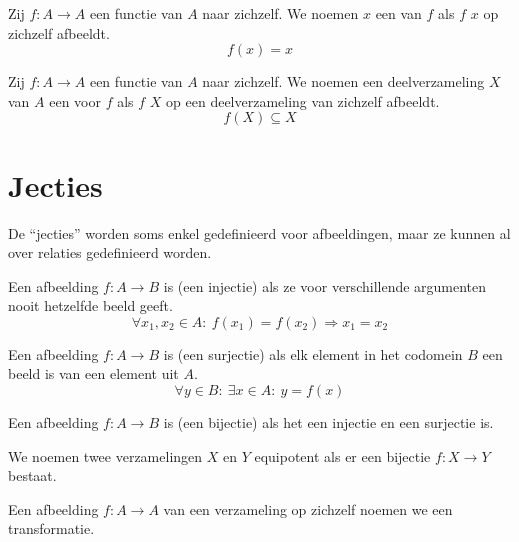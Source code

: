 \documentclass[main.tex]{subfiles}
\begin{document}
\begin{de}
  Zij $f: A \rightarrow A$ een functie van $A$ naar zichzelf.
  We noemen $x$ een  van $f$ als $f$ $x$ op zichzelf afbeeldt.
  \[ f(x) = x \]
\end{de}

\begin{de}
  Zij $f: A \rightarrow A$ een functie van $A$ naar zichzelf.
  We noemen een deelverzameling $X$ van $A$ een  voor $f$ als $f$ $X$ op een deelverzameling van zichzelf afbeeldt.
  \[ f(X) \subseteq X \]
\end{de}

\section{Jecties}
\label{sec:jecties}

\begin{opm}
  De ``jecties'' worden soms enkel gedefinieerd voor afbeeldingen, maar ze kunnen al over relaties gedefinieerd worden.
\end{opm}

\begin{de}
  \label{de:afbeelding-injectief}
  Een afbeelding $f: A \rightarrow B$ is  (een injectie) als ze voor verschillende argumenten nooit hetzelfde beeld geeft.
  \[ \forall x_{1},x_{2} \in A:\ f(x_{1}) = f(x_{2}) \Rightarrow x_{1}= x_{2} \]
\end{de}

\begin{de}
  \label{de:afbeelding-surjectief}
  Een afbeelding $f: A \rightarrow B$ is  (een surjectie) als elk element in het codomein $B$ een beeld is van een element uit $A$.
  \[ \forall y \in B:\ \exists x \in A:\ y = f(x) \]
\end{de}

\begin{de}
  \label{de:afbeelding-bijectief}
  Een afbeelding $f: A \rightarrow B$ is  (een bijectie) als het een injectie en een surjectie is.
\end{de}

\begin{de}
  We noemen twee verzamelingen $X$ en $Y$ equipotent als er een bijectie $f: X \rightarrow Y$ bestaat.
\end{de}

\begin{de}
  Een afbeelding $f: A \rightarrow A$ van een verzameling op zichzelf noemen we een transformatie.
\end{de}
\end{document}
